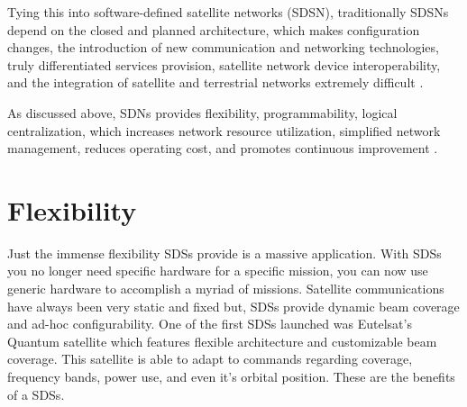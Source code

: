\documentclass[../main.tex]{subfiles}
\begin{document}
Tying this into software-defined satellite networks (SDSN), traditionally SDSNs depend on the closed and planned architecture, which makes configuration changes, the introduction of new communication and networking technologies, truly differentiated services provision, satellite network device interoperability, and the integration of satellite and terrestrial networks extremely difficult \cite{sdsn}.

As discussed above, SDNs provides flexibility, programmability, logical centralization, which increases network resource utilization, simplified network management, reduces operating cost, and promotes continuous improvement \cite{sdsn}.

\section{Flexibility}

Just the immense flexibility SDSs provide is a massive application. With SDSs you no longer need specific hardware for a specific mission, you can now use generic hardware to accomplish a myriad of missions. Satellite communications have always been very static and fixed but, SDSs provide dynamic beam coverage and ad-hoc configurability. One of the first SDSs launched was Eutelsat's Quantum satellite which features flexible architecture and customizable beam coverage. This satellite is able to adapt to commands regarding coverage, frequency bands, power use, and even it's orbital position. These are the benefits of a SDSs.
\end{document}
